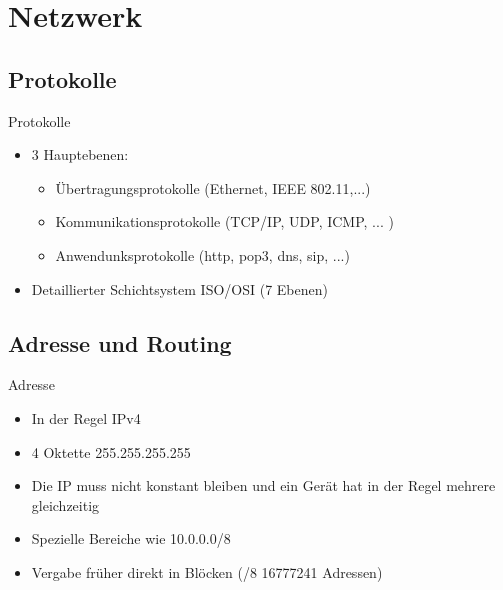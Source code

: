 \documentclass[aspectratio=43]{beamer}
\begin{document}
\section{Netzwerk}
\subsection{Protokolle}
\begin{frame} 

	\begin{block}{Protokolle}
	\begin{itemize}
	\item 3 Hauptebenen:
	\begin{itemize}
	\item Übertragungsprotokolle (Ethernet, IEEE 802.11,...)
	\item Kommunikationsprotokolle (TCP/IP, UDP, ICMP, ... )
	\item Anwendunksprotokolle (http, pop3, dns, sip, ...)
	\end{itemize}
	\item Detaillierter Schichtsystem ISO/OSI (7 Ebenen)
	\end{itemize}
	\end{block}
	
\end{frame}
\subsection{Adresse und Routing}
\begin{frame} 

	\begin{block}{Adresse}
	\begin{itemize}
	\item In der Regel IPv4
	\item 4 Oktette 255.255.255.255
	\item Die IP muss nicht konstant bleiben und ein Gerät hat in der Regel mehrere gleichzeitig 
	\item Spezielle Bereiche wie 10.0.0.0/8
	\item Vergabe früher direkt in Blöcken (/8 16777241 Adressen)
	\end{itemize}
	\end{block}
	
\end{frame}
\end{document}
